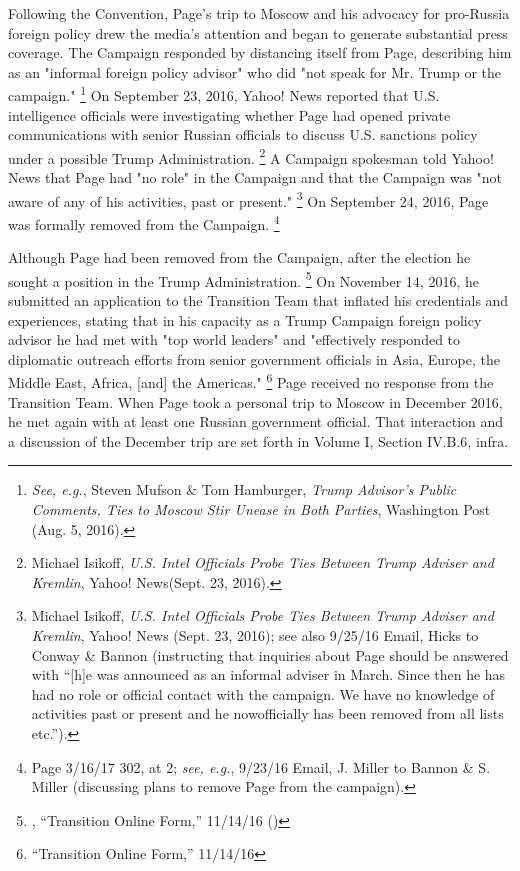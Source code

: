 Following the Convention, Page's trip to Moscow and his advocacy for pro-Russia foreign policy drew the media's attention and began to generate substantial press coverage.
The Campaign responded by distancing itself from Page, describing him as an "informal foreign policy advisor" who did "not speak for Mr. Trump or the campaign."%
\footnote{\textit{See, e.g.}, Steven Mufson \& Tom Hamburger, \textit{Trump Advisor’s Public Comments, Ties to Moscow Stir Unease in Both Parties}, Washington Post (Aug. 5, 2016).}
On September 23, 2016, Yahoo! News reported that U.S. intelligence officials were investigating whether Page had opened private communications with senior Russian officials to discuss U.S. sanctions policy under a possible Trump Administration.%
\footnote{Michael Isikoff, \textit{U.S. Intel Officials Probe Ties Between Trump Adviser and Kremlin}, Yahoo! News(Sept. 23, 2016).}
A Campaign spokesman told Yahoo! News that Page had "no role" in the Campaign and that the Campaign was "not aware of any of his activities, past or present."%
\footnote{Michael Isikoff, \textit{U.S. Intel Officials Probe Ties Between Trump Adviser and Kremlin}, Yahoo! News (Sept. 23, 2016);
see also 9/25/16 Email, Hicks to Conway \& Bannon (instructing that inquiries about Page should be answered with “[h]e was announced as an informal adviser in March.
Since then he has had no role or official contact with the campaign.
We have no knowledge of activities past or present and he nowofficially has been removed from all lists etc.”).}
On September 24, 2016, Page was formally removed from the Campaign.%
\footnote{Page 3/16/17 302, at 2;
\textit{see, e.g.}, 9/23/16 Email, J. Miller to Bannon \& S. Miller (discussing plans to remove Page from the campaign).}

Although Page had been removed from the Campaign, after the election he sought a position in the Trump Administration.%
\footnote{, “Transition Online Form,” 11/14/16 ()}
On November 14, 2016, he submitted an application to the Transition Team that inflated his credentials and experiences, stating that in his capacity as a Trump Campaign foreign policy advisor he had met with "top world leaders" and "effectively responded to diplomatic outreach efforts from senior government officials in Asia, Europe, the Middle East, Africa, [and] the Americas."%
\footnote{ “Transition Online Form,” 11/14/16 }
Page received no response from the Transition Team.
When Page took a personal trip to Moscow in December 2016, he met again with at least one Russian government official.
That interaction and a discussion of the December trip are set forth in Volume I, Section IV.B.6, infra.

